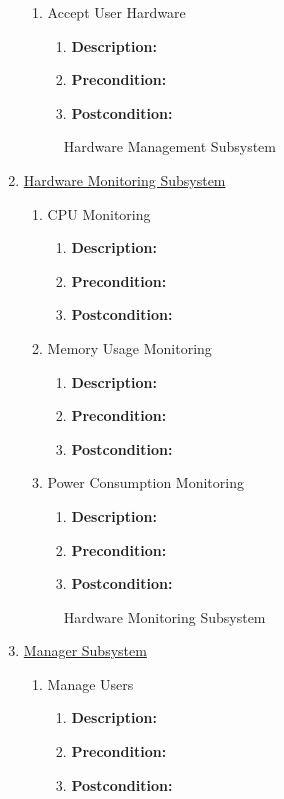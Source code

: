 \documentclass{article}
\begin{document}
\begin{enumerate}
\begin{enumerate}
        \item Accept User Hardware
		\begin{enumerate}
			\item \textbf{Description:} 
			\item \textbf{Precondition:}
			\item \textbf{Postcondition:}\newline
		\end{enumerate}
        \end{enumerate}
        \begin{figure}[h!]
		\caption{Hardware Management Subsystem}	
	\end{figure}	
	
	\item \underline{Hardware Monitoring Subsystem}
			\begin{enumerate}
		\item CPU Monitoring 
		\begin{enumerate}
			\item \textbf{Description:} 
			\item \textbf{Precondition:} 
			\item \textbf{Postcondition:}\newline
		\end{enumerate}
		
		\item Memory Usage Monitoring 
		\begin{enumerate}
			\item \textbf{Description:}
			\item \textbf{Precondition:} 
			\item \textbf{Postcondition:} \newline
		\end{enumerate}
		
		\item Power Consumption Monitoring
		\begin{enumerate}
			\item \textbf{Description:} 
			\item \textbf{Precondition:}
			\item \textbf{Postcondition:}\newline
		\end{enumerate}
	\end{enumerate}
	\begin{figure}[h!]
		\caption{Hardware Monitoring Subsystem}	
	\end{figure}	
	
	\item \underline{Manager Subsystem}
    \begin{enumerate}
		\item Manage Users
		\begin{enumerate}
			\item \textbf{Description:} 
			\item \textbf{Precondition:} 
			\item \textbf{Postcondition:}\newline
		\end{enumerate}
		

\end{enumerate}
\end{enumerate}
\end{document}
